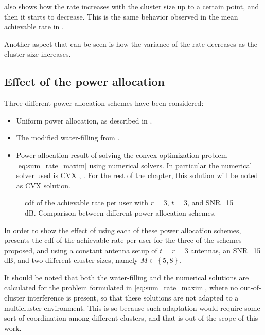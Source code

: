  also shows how the rate increases with the cluster
size up to a certain point, and then it starts to decrease. This is the same
behavior observed in the mean achievable rate in .

Another aspect that can be seen is how the variance of the rate decreases as the
cluster size increases.

\subsection{Effect of the power allocation}\label{ssec:stats_power_alloc}

Three different power allocation schemes have been considered:

\begin{itemize}
   \item Uniform power allocation, as described in
      .
   \item The modified water-filling from .
   \item Power allocation result of solving the convex optimization
      problem \eqref{eq:sum_rate_maxim} using numerical solvers. In particular
      the numerical solver used is CVX \cite{cvx}, \cite{gb08}. For the rest of
      the chapter, this solution will be noted as CVX solution.
\end{itemize}

\begin{figure}[t]
    \centering
    \begin{minipage}[t]{0.7\textwidth}
        
    \end{minipage}
\caption{\gls{cdf} of the achievable rate per user with $r=3$, $t=3$, and SNR=15\,dB.
Comparison between different power allocation schemes.}
\label{fig:cdf_power_alloc}
\end{figure}

In order to show the effect of using each of these power allocation schemes,
 presents the \gls{cdf} of the achievable rate per
user for the three of the schemes proposed, and using a constant antenna setup
of $t = r = 3$ antennas, an SNR=15\,dB, and two different cluster sizes, namely
$M \in \left\{5, 8\right\}$.

It should be noted that both the water-filling and the numerical solutions are
calculated for the problem formulated in \eqref{eq:sum_rate_maxim}, where no
out-of-cluster interference is present, so that these solutions are not adapted
to a multicluster environment. This is so because such adaptation would require
some sort of coordination among different clusters, and that is out of the scope
of this work.

